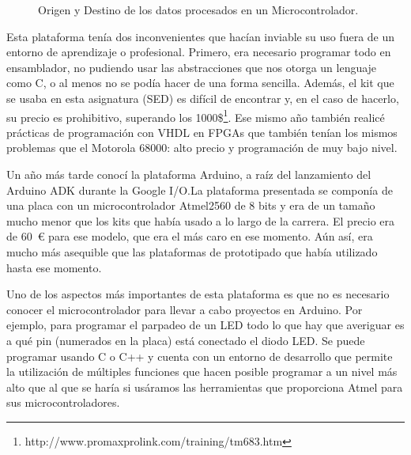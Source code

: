 \begin{figure}[H]
\begin{center}
\end{center}
\caption{Origen y Destino de los datos procesados en un Microcontrolador.}
\label{io_uc}
\end{figure}
Esta plataforma tenía dos inconvenientes que hacían inviable su uso fuera de un entorno de aprendizaje o profesional.  Primero, era necesario programar todo en ensamblador, no pudiendo usar las abstracciones que nos otorga un lenguaje como C, o al menos no se podía hacer de una forma sencilla.  Además, el kit que se usaba en esta asignatura (SED) es difícil de encontrar y, en el caso de hacerlo, su precio es prohibitivo, superando los 1000\$\footnote{http://www.promaxprolink.com/training/tm683.htm}.  Ese mismo año también realicé prácticas de programación con VHDL en FPGAs que también tenían los mismos problemas que el Motorola 68000: alto precio y programación de muy bajo nivel.

Un año más tarde conocí la plataforma Arduino, a raíz del lanzamiento del Arduino ADK durante la Google I/O.\@ La plataforma presentada se componía de una placa con un microcontrolador Atmel2560 de 8 bits y era de un tamaño mucho menor que los kits que había usado a lo largo de la carrera.  El precio era de 60~\euro{} para ese modelo, que era el más caro en ese momento. Aún así, era mucho más asequible que las plataformas de prototipado que había utilizado hasta ese momento.  

Uno de los aspectos más importantes de esta plataforma es que no es necesario conocer el microcontrolador para llevar a cabo proyectos en Arduino.  Por ejemplo, para programar el parpadeo de un LED todo lo que hay que averiguar es a qué pin (numerados en la placa) está conectado el diodo LED. Se puede programar usando C o C++ y cuenta con un entorno de desarrollo que permite la utilización de múltiples funciones que hacen posible programar a un nivel más alto que al que se haría si usáramos las herramientas que proporciona Atmel para sus microcontroladores.  

